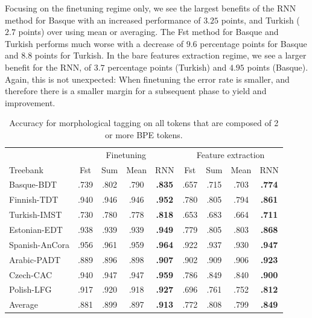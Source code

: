 \documentclass[11pt]{article}
\begin{document}
                Focusing on the finetuning regime only, we see the
     largest benefits of the RNN method for Basque with an increased
     performance of $3.25$ points, and Turkish ($2.7$ points) over
     using mean or averaging. The Fst method for Basque and Turkish
     performs much worse with a decrease of $9.6$ percentage points
     for Basque and $8.8$ points for Turkish.
        In the bare features extraction regime, we see a larger
     benefit for the RNN, of $3.7$ percentage points (Turkish) and
     $4.95$ points (Basque). Again, this is not unexpected: When
     finetuning the error rate is smaller, and therefore there is a
     smaller margin for a subsequent phase to yield and improvement.
    

    
	\begin{table}%
	\centering
	\begin{tabular}{l|cccc|cccc}
		 & \multicolumn{4}{c}{Finetuning} & \multicolumn{4}{c}{Feature extraction} \\
		Treebank & Fst & Sum & Mean & RNN & Fst & Sum & Mean & RNN  \\
		 \hline
        Basque-BDT      & .739 & .802 & .790 & \textbf{.835} & .657 & .715 & .703 & \textbf{.774} \\
		Finnish-TDT     & .940 & .946 & .946 & \textbf{.952} & .780 & .805 & .794 & \textbf{.861} \\ 
		Turkish-IMST    & .730 & .780 & .778 & \textbf{.818} & .653 & .683 & .664 & \textbf{.711} \\
		Estonian-EDT    & .938 & .939 & .939 & \textbf{.949} & .779 & .805 & .803 & \textbf{.868} \\
		Spanish-AnCora  & .956 & .961 & .959 & \textbf{.964} & .922 & .937 & .930 & \textbf{.947} \\
		Arabic-PADT     & .889 & .896 & .898 & \textbf{.907} & .902 & .909 & .906 & \textbf{.923}\\
		Czech-CAC       & .940 & .947 & .947 & \textbf{.959} & .786 & .849 & .840 & \textbf{.900} \\
		Polish-LFG      & .917 & .920 & .918 & \textbf{.927} & .696 & .761 & .752 & \textbf{.812} \\
        \hline
        Average         & .881 & .899 & .897 & \textbf{.913} & .772 & .808 & .799 & \textbf{.849} \\
	\end{tabular}
    \caption{\label{tab:results_large_tokens} Accuracy for
     morphological tagging on all tokens that are composed of 2 or
     more BPE tokens.}
\end{table}
\end{document}
